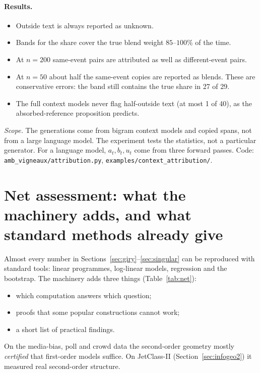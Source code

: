 \documentclass[11pt]{article}
\theoremstyle{definition}
\theoremstyle{remark}
\begin{document}
\paragraph{Results.}
\begin{itemize}
  \item Outside text is always reported as unknown.
  \item Bands for the share cover the true blend weight $85$--$100\%$ of the time.
  \item At $n=200$ same-event pairs are attributed as well as different-event pairs.
  \item At $n=50$ about half the same-event copies are reported as blends. These are conservative errors: the band still contains the true share in 27 of 29.
  \item The full context models never flag half-outside text (at most 1 of 40), as the absorbed-reference proposition predicts.
\end{itemize}
\emph{Scope.} The generations come from bigram context models and copied spans, not from a large language model. The experiment tests the statistics, not a particular generator. For a language model, $a_t,b_t,u_t$ come from three forward passes. Code: \texttt{amb\_vigneaux/attribution.py}, \texttt{examples/context\_attribution/}.

\section{Net assessment: what the machinery adds, and what standard methods already give}\label{sec:net}
Almost every number in Sections~\ref{sec:giry}--\ref{sec:singular} can be reproduced with standard tools: linear programmes, log-linear models, regression and the bootstrap. The machinery adds three things (Table~\ref{tab:net}):
\begin{itemize}
  \item which computation answers which question;
  \item proofs that some popular constructions cannot work;
  \item a short list of practical findings.
\end{itemize}
On the media-bias, poll and crowd data the second-order geometry mostly \emph{certified} that first-order models suffice. On JetClass-II (Section~\ref{sec:infogeo2}) it measured real second-order structure.
\end{document}
